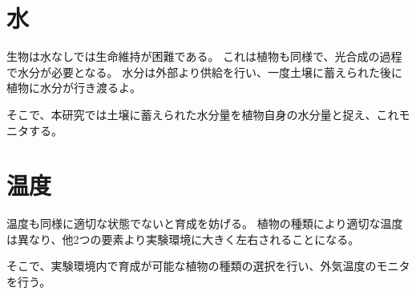 \section{水}
生物は水なしでは生命維持が困難である。
これは植物も同様で、光合成の過程で水分が必要となる。
水分は外部より供給を行い、一度土壌に蓄えられた後に植物に水分が行き渡るよ。
\par そこで、本研究では土壌に蓄えられた水分量を植物自身の水分量と捉え、これモニタする。
\section{温度}
温度も同様に適切な状態でないと育成を妨げる。
植物の種類により適切な温度は異なり、他2つの要素より実験環境に大きく左右されることになる。
\par そこで、実験環境内で育成が可能な植物の種類の選択を行い、外気温度のモニタを行う。

